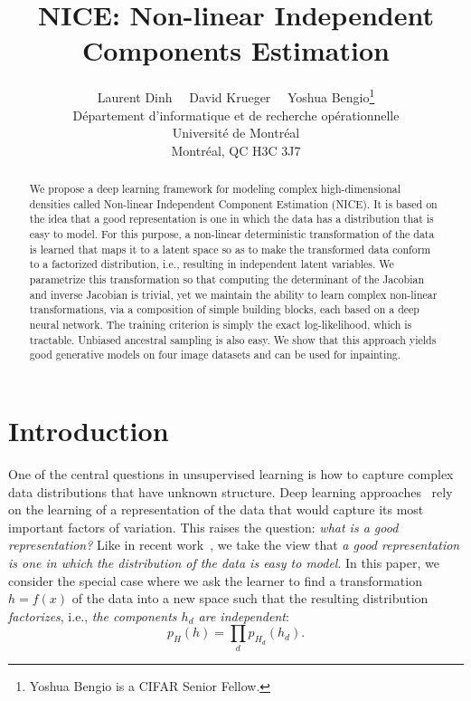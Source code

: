 \documentclass{article}
\title{NICE: Non-linear Independent Components Estimation}
\author{Laurent Dinh
\ \  David Krueger
\ \ Yoshua Bengio\thanks{Yoshua Bengio is a CIFAR Senior Fellow.}\\
D\'epartement d'informatique et de recherche op\'erationnelle\\
Universit\'e de Montr\'eal\\
Montr\'eal, QC H3C 3J7 \\
}
\date{}
\begin{document}
\maketitle

\begin{abstract}
We propose a deep learning framework for modeling complex high-dimensional
densities called Non-linear Independent Component Estimation (NICE).  It is based
on the idea that a good representation is one in which the data has a distribution
that is easy to model. For this purpose, a
non-linear deterministic transformation of the data is learned that maps it to a latent space
so as to make the transformed data conform to a factorized distribution,
i.e., resulting in independent latent variables. 
We parametrize this transformation so that computing the determinant of the Jacobian and inverse Jacobian is trivial, yet we maintain the
ability to learn complex non-linear transformations, via a composition of
simple building blocks, each based on a deep neural network. The training
criterion is simply the exact log-likelihood, which is tractable. Unbiased ancestral
sampling is also easy. We show that this approach yields good
generative models on four image datasets and can be used for inpainting.
\end{abstract}

\section{Introduction}

One of the central questions in unsupervised learning is how to capture
complex data distributions that have unknown structure. Deep learning
approaches~\citep{Bengio-2009-book} rely on the learning of a representation
of the data that would capture its most important factors
of variation. This raises the question: {\em what is a good representation?}
Like in recent work~\citep{Kingma+Welling-ICLR2014,Rezende-et-al-arxiv2014,Ozair+Bengio-arxiv2014},
we take the view that {\em a good representation is one in which the distribution
of the data is easy to model}.  In this paper,  we consider the
special case where we ask the learner to find a transformation $h=f(x)$ of the data
into a new space such that the resulting distribution {\em factorizes}, i.e., 
{\em the components $h_d$ are independent}:
\[
  p_H(h) = \prod_d p_{H_d}(h_d).
\]
\end{document}
